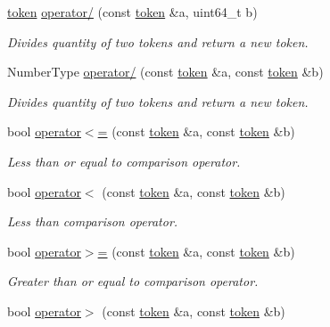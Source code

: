 \begin{DoxyCompactItemize}
\mbox{\hyperlink{classaacio_1_1token}{token}} \mbox{\hyperlink{classaacio_1_1token_a4dd26892eab5e2694462009f78066779}{operator/}} (const \mbox{\hyperlink{classaacio_1_1token}{token}} \&a, uint64\+\_\+t b)
\begin{DoxyCompactList}\small\item\em Divides quantity of two tokens and return a new token. \end{DoxyCompactList}\item 
Number\+Type \mbox{\hyperlink{classaacio_1_1token_a050f626d33d35899977abb07e1d35575}{operator/}} (const \mbox{\hyperlink{classaacio_1_1token}{token}} \&a, const \mbox{\hyperlink{classaacio_1_1token}{token}} \&b)
\begin{DoxyCompactList}\small\item\em Divides quantity of two tokens and return a new token. \end{DoxyCompactList}\item 
bool \mbox{\hyperlink{classaacio_1_1token_a6b52167a67ce0bac1f928747ce1247fb}{operator$<$=}} (const \mbox{\hyperlink{classaacio_1_1token}{token}} \&a, const \mbox{\hyperlink{classaacio_1_1token}{token}} \&b)
\begin{DoxyCompactList}\small\item\em Less than or equal to comparison operator. \end{DoxyCompactList}\item 
bool \mbox{\hyperlink{classaacio_1_1token_acba3f114f474466a7c6c8a77b88723df}{operator$<$}} (const \mbox{\hyperlink{classaacio_1_1token}{token}} \&a, const \mbox{\hyperlink{classaacio_1_1token}{token}} \&b)
\begin{DoxyCompactList}\small\item\em Less than comparison operator. \end{DoxyCompactList}\item 
bool \mbox{\hyperlink{classaacio_1_1token_abf600f9ac9c421e3bf284577acd22547}{operator$>$=}} (const \mbox{\hyperlink{classaacio_1_1token}{token}} \&a, const \mbox{\hyperlink{classaacio_1_1token}{token}} \&b)
\begin{DoxyCompactList}\small\item\em Greater than or equal to comparison operator. \end{DoxyCompactList}\item 
bool \mbox{\hyperlink{classaacio_1_1token_a8b91c489658673e83721c460cb922df5}{operator$>$}} (const \mbox{\hyperlink{classaacio_1_1token}{token}} \&a, const \mbox{\hyperlink{classaacio_1_1token}{token}} \&b)

\end{DoxyCompactItemize}
